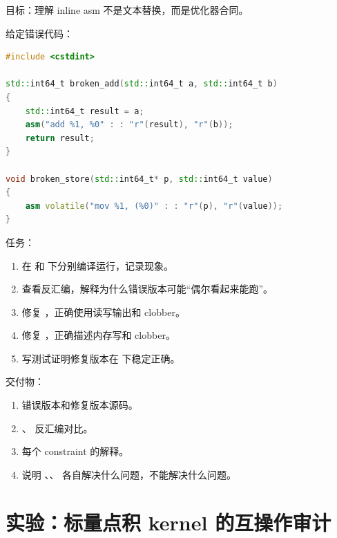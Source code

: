 \begin{labbox}
目标：理解 inline asm 不是文本替换，而是优化器合同。

给定错误代码：

\begin{lstlisting}[language=C++]
#include <cstdint>

std::int64_t broken_add(std::int64_t a, std::int64_t b)
{
    std::int64_t result = a;
    asm("add %1, %0" : : "r"(result), "r"(b));
    return result;
}

void broken_store(std::int64_t* p, std::int64_t value)
{
    asm volatile("mov %1, (%0)" : : "r"(p), "r"(value));
}
\end{lstlisting}

任务：

\begin{enumerate}
  \item 在  和  下分别编译运行，记录现象。
  \item 查看反汇编，解释为什么错误版本可能“偶尔看起来能跑”。
  \item 修复 ，正确使用读写输出和  clobber。
  \item 修复 ，正确描述内存写和  clobber。
  \item 写测试证明修复版本在  下稳定正确。
\end{enumerate}

交付物：

\begin{enumerate}
  \item 错误版本和修复版本源码。
  \item {}、 反汇编对比。
  \item 每个 constraint 的解释。
  \item 说明 、、 各自解决什么问题，不能解决什么问题。
\end{enumerate}
\end{labbox}

\section{实验：标量点积 kernel 的互操作审计}

